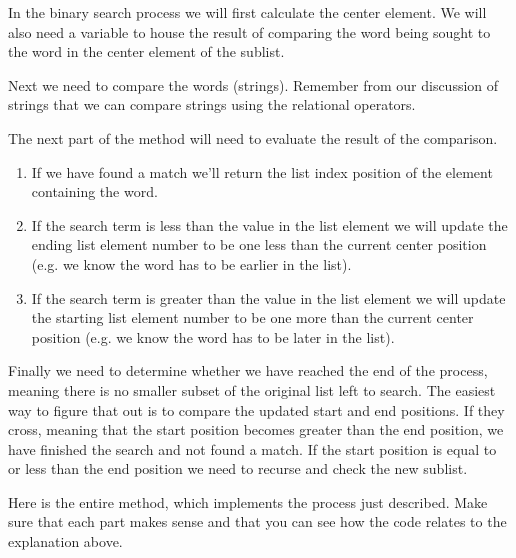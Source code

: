 In the binary search process we will first calculate the center element. We will also need a variable to house the result of comparing the word being sought to the word in the center element of the sublist.

Next we need to compare the words (strings). Remember from our discussion of strings that we can compare strings using the relational operators.

The next part of the method will need to evaluate the result of the comparison.

\begin{enumerate}
	\item If we have found a match we'll return the list index position of the element containing the word. 
	\item If the search term is less than the value in the list element we will update the ending list element number to be one less than the current center position (e.g. we know the word has to be earlier in the list).
	\item If the search term is greater than the value in the list element we will update the starting list element number to be one more than the current center position (e.g. we know the word has to be later in the list).
\end{enumerate}

Finally we need to determine whether we have reached the end of the process, meaning there is no smaller subset of the original list left to search. The easiest way to figure that out is to compare the updated start and end positions. If they cross, meaning that the start position becomes greater than the end position, we have finished the search and not found a match. If the start position is equal to or less than the end position we need to recurse and check the new sublist.

Here is the entire method, which implements the process just described. Make sure that each part makes sense and that you can see how the code relates to the explanation above.

